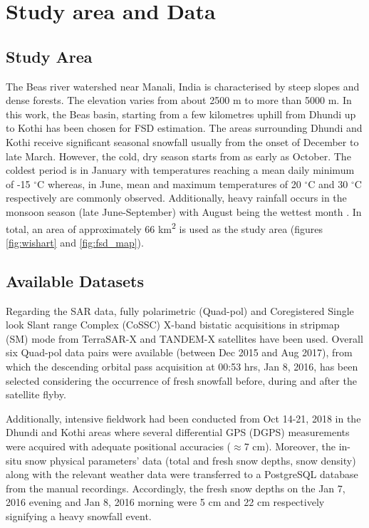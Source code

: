 \documentclass{article}
\begin{document}
\section{Study area and Data}
\label{sec:study}

\subsection{Study Area}
\label{ssec:area}
The Beas river watershed near Manali, India is characterised by steep slopes and dense forests. The elevation varies from about 2500 m to more than 5000 m. In this work, the Beas basin, starting from a few kilometres uphill from Dhundi up to Kothi has been chosen for FSD estimation. The areas surrounding Dhundi and Kothi receive significant seasonal snowfall usually from the onset of December to late March. However, the cold, dry season starts from as early as October. The coldest period is in January with temperatures reaching a mean daily minimum of -15 $^\circ$C whereas, in June, mean and maximum temperatures of 20 $^\circ$C and 30 $^\circ$C respectively are commonly observed. Additionally, heavy rainfall occurs in the monsoon season (late June-September) with August being the wettest month \cite{Thakur2012}. In total, an area of approximately 66 km\textsuperscript{2} is used as the study area (figures \ref{fig:wishart} and \ref{fig:fsd_map}).

\subsection{Available Datasets}
\label{ssec:data}
Regarding the SAR data, fully polarimetric (Quad-pol) and Coregistered Single look Slant range Complex (CoSSC) X-band bistatic acquisitions in stripmap (SM) mode from TerraSAR-X and TANDEM-X satellites have been used. Overall six Quad-pol data pairs were available (between Dec 2015 and Aug 2017), from which the descending orbital pass acquisition at 00:53 hrs, Jan 8, 2016, has been selected considering the occurrence of fresh snowfall before, during and after the satellite flyby.

Additionally, intensive fieldwork had been conducted from Oct 14-21, 2018 in the Dhundi and Kothi areas where several differential GPS (DGPS) measurements were acquired with adequate positional accuracies ($\approx$7 cm). Moreover, the in-situ snow physical parameters’ data (total and fresh snow depths, snow density) along with the relevant weather data were transferred to a PostgreSQL database from the manual recordings. Accordingly, the fresh snow depths on the Jan 7, 2016 evening and Jan 8, 2016 morning were 5 cm and 22 cm respectively signifying a heavy snowfall event. 
\end{document}
